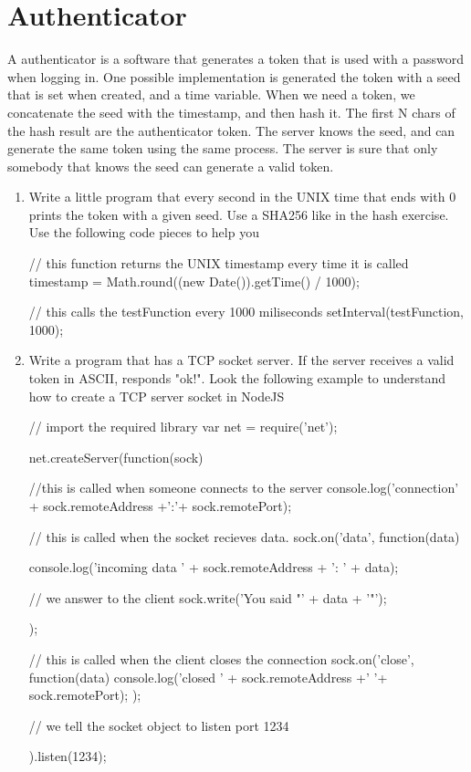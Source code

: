 \section{Authenticator}
A authenticator is a software that generates a token that is used with a password when logging in. One possible implementation is generated the token with a seed that is set when created, and a time variable. When we need a token, we concatenate the seed with the timestamp, and then hash it. The first N chars of the hash result are the authenticator token. The server knows the seed, and can generate the same token using the same process. The server is sure that only somebody that knows the seed can generate a valid token.

\begin{Exercise}[label={authenticator}]
\begin{enumerate}
\item Write a little program that every second in the UNIX time that ends with 0 prints the token with a given seed. Use a SHA256 like in the hash exercise. Use the following code pieces to help you
\begin{js}
// this function returns the UNIX timestamp every time it is called
timestamp = Math.round((new Date()).getTime() / 1000);
\end{js}

\begin{js}
// this calls the testFunction every 1000 miliseconds
setInterval(testFunction, 1000);
\end{js}

\item Write a program that has a TCP socket server. If the server receives a valid token in ASCII, responds "ok!". Look the following example to understand how to create a TCP server socket in NodeJS

\begin{js}
// import the required library
var net = require('net');

net.createServer(function(sock) {
  //this is called when someone connects to the server
  console.log('connection' + sock.remoteAddress +':'+ sock.remotePort);
  
  // this is called when the socket recieves data.
  sock.on('data', function(data) {
    console.log('incoming data ' + sock.remoteAddress + ': ' + data);
    
    // we answer to the client
    sock.write('You said "' + data + '"');
  });
  
  // this is called when the client closes the connection
  sock.on('close', function(data) {
    console.log('closed ' + sock.remoteAddress +' '+ sock.remotePort);
  });

// we tell the socket object to listen port 1234
}).listen(1234);
\end{js}

\end{enumerate}
\end{Exercise}

